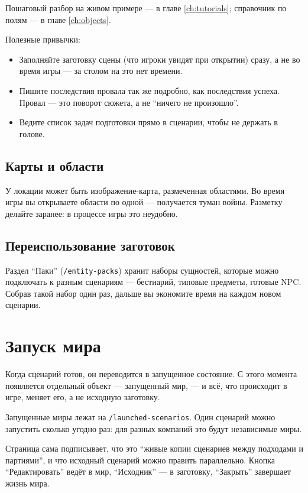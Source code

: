 Пошаговый разбор на живом примере --- в главе \ref{ch:tutorials}; справочник по полям --- в главе \ref{ch:objects}.

Полезные привычки:

\begin{itemize}
\item Заполняйте заготовку сцены (что игроки увидят при открытии) сразу, а не во время игры --- за столом на это нет времени.
\item Пишите последствия провала так же подробно, как последствия успеха. Провал --- это поворот сюжета, а не ``ничего не произошло''.
\item Ведите список задач подготовки прямо в сценарии, чтобы не держать в голове.
\end{itemize}

\subsection{Карты и области}
У локации может быть изображение-карта, размеченная областями. Во время игры вы открываете области по одной --- получается туман войны. Разметку делайте заранее: в процессе игры это неудобно.

\subsection{Переиспользование заготовок}
Раздел ``Паки'' (\texttt{/entity-packs}) хранит наборы сущностей, которые можно подключать к разным сценариям --- бестиарий, типовые предметы, готовые NPC. Собрав такой набор один раз, дальше вы экономите время на каждом новом сценарии.

\section{Запуск мира}
\label{sec:master:launch}

Когда сценарий готов, он переводится в запущенное состояние. С этого момента появляется отдельный объект --- запущенный мир, --- и всё, что происходит в игре, меняет его, а не исходную заготовку.

Запущенные миры лежат на \texttt{/launched-scenarios}. Один сценарий можно запустить сколько угодно раз: для разных компаний это будут независимые миры.


Страница сама подписывает, что это ``живые копии сценариев между подходами и партиями'', и что исходный сценарий можно править параллельно. Кнопка ``Редактировать'' ведёт в мир, ``Исходник'' --- в заготовку, ``Закрыть'' завершает жизнь мира.


